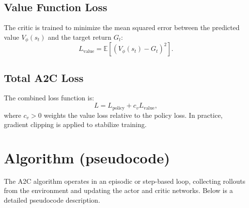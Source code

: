 \documentclass[11pt]{article}
\begin{document}
\subsection{Value Function Loss}
The critic is trained to minimize the mean squared error between the predicted value $V_\phi(s_t)$ and the target return $G_t$:
\begin{equation}
L_{\text{value}} = \mathbb{E} [(V_\phi(s_t) - G_t)^2].
\end{equation}

\subsection{Total A2C Loss}
The combined loss function is:
\begin{equation}
L = L_{\text{policy}} + c_v L_{\text{value}},
\end{equation}
where $c_v > 0$ weights the value loss relative to the policy loss. In practice, gradient clipping is applied to stabilize training.
\section{Algorithm (pseudocode)}
The A2C algorithm operates in an episodic or step-based loop, collecting rollouts from the environment and updating the actor and critic networks. Below is a detailed pseudocode description.
\end{document}
